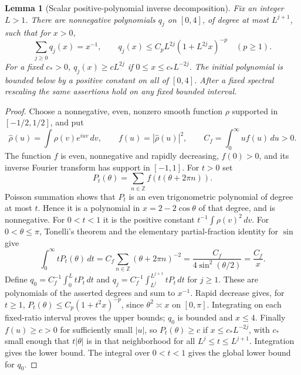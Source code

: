 \documentclass[11pt]{article}
\newtheorem{lemma}[proposition]{Lemma}
\begin{document}
\begin{lemma}[Scalar positive-polynomial inverse decomposition]
\label{complete:scalar-polynomials}
Fix an integer \(L>1\). There are nonnegative polynomials \(q_j\)
on \([0,4]\), of degree at most \(L^{j+1}\), such that for \(x>0\),
\[
 \sum_{j\ge0}q_j(x)=x^{-1},\qquad
 q_j(x)\le C_pL^{2j}(1+L^{2j}x)^{-p}\quad(p\ge1).
\]
For a fixed \(c_*>0\),
\(q_j(x)\ge cL^{2j}\) if \(0\le x\le c_*L^{-2j}\).
The initial polynomial is bounded below by a positive constant on
all of \([0,4]\). After a fixed spectral rescaling the same assertions
hold on any fixed bounded interval.
\end{lemma}
\begin{proof}
Choose a nonnegative, even, nonzero smooth function \(\rho\) supported
in \([-1/2,1/2]\), and put
\[
 \widehat\rho(u)=\int\rho(v)e^{iuv}\,dv,\qquad
 f(u)=|\widehat\rho(u)|^2,\qquad
 C_f=\int_0^\infty u f(u)\,du>0.
\]
The function \(f\) is even, nonnegative and rapidly decreasing,
\(f(0)>0\), and its inverse Fourier transform has support
in \([-1,1]\). For \(t>0\) set
\[
 P_t(\theta)=\sum_{n\in\mathbb Z}f(t(\theta+2\pi n)).
\]
Poisson summation shows that \(P_t\) is an even trigonometric
polynomial of degree at most \(t\). Hence it is a polynomial in
\(x=2-2\cos\theta\) of that degree, and is nonnegative. For
\(0<t<1\) it is the positive constant
\(t^{-1}\int\rho(v)^2\,dv\). For \(0<\theta\le\pi\), Tonelli's
theorem and the elementary partial-fraction identity for \(\sin\)
give
\[
 \int_0^\infty tP_t(\theta)\,dt
 = C_f\sum_{n\in\mathbb Z}(\theta+2\pi n)^{-2}
 =\frac{C_f}{4\sin^2(\theta/2)}=\frac{C_f}{x}.
\]
Define \(q_0=C_f^{-1}\int_0^L tP_t\,dt\) and
\(q_j=C_f^{-1}\int_{L^j}^{L^{j+1}}tP_t\,dt\) for \(j\ge1\).
These are polynomials of the asserted degrees and sum to \(x^{-1}\).
Rapid decrease gives, for \(t\ge1\),
\(P_t(\theta)\le C_p(1+t^2x)^{-p}\), since
\(\theta^2\asymp x\) on \([0,\pi]\). Integrating on each
fixed-ratio interval proves the upper bounds; \(q_0\) is bounded
and \(x\le4\). Finally \(f(u)\ge c>0\) for sufficiently small
\(|u|\), so \(P_t(\theta)\ge c\) if
\(x\le c_*L^{-2j}\), with \(c_*\) small enough that
\(t|\theta|\) is in that neighborhood for all
\(L^j\le t\le L^{j+1}\). Integration gives the lower bound.
The integral over \(0<t<1\) gives the global lower bound for \(q_0\).
\end{proof}
\end{document}
